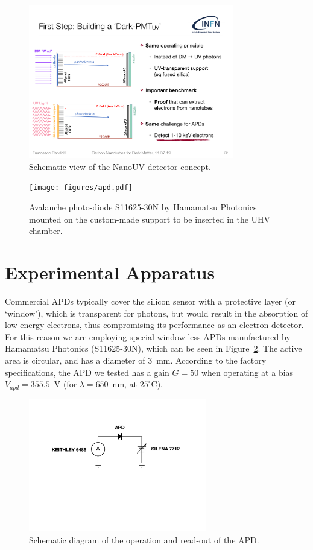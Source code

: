 \documentclass[12p]{paper}
\begin{document}
\begin{figure}[hbt]
  \centering
  \includegraphics[width=0.8\textwidth]{figures/nanouv.pdf}
 \caption{Schematic view of the NanoUV detector concept.
  \label{fig:nanouv}}
\end{figure}


\begin{figure}[htb]
  \centering
  \texttt{[image: figures/apd.pdf]}
 \caption{Avalanche photo-diode S11625-30N by Hamamatsu Photonics mounted on the custom-made support to be inserted in the UHV chamber.
  \label{fig:apd}}
\end{figure}


\section{Experimental Apparatus}

Commercial APDs typically cover the silicon sensor with a protective layer (or `window'), which is transparent for photons, but would result in the absorption of low-energy electrons, thus compromising its performance as an electron detector. For this reason we are employing special window-less APDs manufactured by Hamamatsu Photonics (S11625-30N), which can be seen in Figure~\ref{fig:apd}. The active area is circular, and has a diameter of 3~mm. According to the factory specifications, the APD we tested has a gain $G = 50$ when operating at a bias $V_{apd} = 355.5$~V (for $\lambda = 650$~nm, at $25^{\circ}$C).


\begin{figure}[tb]
  \centering
\includegraphics[width=0.69\textwidth]{figures/circuit}
 \caption{Schematic diagram of the operation and read-out of the APD.
  \label{fig:schema}}
\end{figure}
\end{document}
